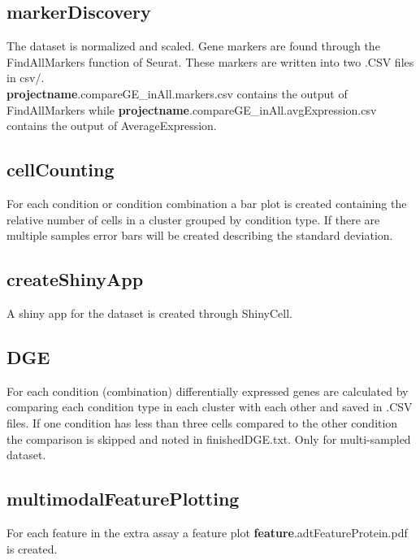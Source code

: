 \subsection{markerDiscovery}
The dataset is normalized and scaled. Gene markers are found through the FindAllMarkers function of Seurat. These markers are written into two .CSV files in csv/.\\ \textbf{projectname}.compareGE\_inAll.markers.csv contains the output of FindAllMarkers while \textbf{projectname}.compareGE\_inAll.avgExpression.csv contains the output of AverageExpression.

\subsection{cellCounting}
For each condition or condition combination a bar plot is created containing the relative number of cells in a cluster grouped by condition type. If there are multiple samples error bars will be created describing the standard deviation.

\subsection{createShinyApp}
A shiny app for the dataset is created through ShinyCell.

\subsection{DGE}
For each condition (combination) differentially expressed genes are calculated by comparing each condition type in each cluster with each other and saved in .CSV files. If one condition has less than three cells compared to the other condition the comparison is skipped and noted in finishedDGE.txt. Only for multi-sampled dataset.

\subsection{multimodalFeaturePlotting}
For each feature in the extra assay a feature plot \textbf{feature}.adtFeatureProtein.pdf is created.
